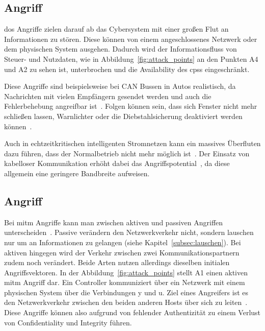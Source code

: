 \documentclass[final,bibliography=totocnumbered]{include/sikseminar}
\newcommand{\cps}{\glspl{cps}\xspace}
\begin{document}
\subsection{ Angriff}\label{subsec:dos}

\gls{dos} Angriffe zielen darauf ab das Cybersystem mit einer großen Flut an Informationen zu stören.
Diese können von einem angeschlossenes Netzwerk oder dem physischen System ausgehen.
Dadurch wird der Informationsfluss von Steuer- und Nutzdaten, wie in Abbildung~\ref{fig:attack_points} an den Punkten A4 und A2 zu sehen ist, unterbrochen und die Availability des \cps eingeschränkt.

Diese Angriffe sind beispielsweise bei CAN Bussen in Autos realistisch, da Nachrichten mit vielen Empfängern gesendet werden und auch die Fehlerbehebung angreifbar ist~\cite{Koscher2010,Cheminod2013}.%
Folgen können sein, dass sich Fenster nicht mehr schließen lassen, Warnlichter oder die Diebstahlsicherung deaktiviert werden können~\cite{Hoppe2008}.

Auch in echtzeitkritischen intelligenten Stromnetzen kann ein massives Überfluten dazu führen, dass der Normalbetrieb nicht mehr möglich ist~\cite{Lu2010}.
Der Einsatz von kabelloser Kommunikation erhöht dabei das Angriffspotential~\cite{Lu2011}, da diese allgemein eine geringere Bandbreite aufweisen.
\subsection{ Angriff}\label{subsec:mitm}
Bei \gls{mitm} Angriffe kann man zwischen aktiven und passiven Angriffen unterscheiden~\cite{WYX+10}.
Passive verändern den Netzwerkverkehr nicht, sondern lauschen nur um an Informationen zu gelangen (siehe Kapitel~\ref{subsec:lauschen}).
Bei aktiven hingegen wird der Verkehr zwischen zwei Kommunikationspartnern zudem noch verändert.
Beide Arten nutzen allerdings dieselben initialen Angriffsvektoren.
In der Abbildung~\ref{fig:attack_points} stellt A1 einen aktiven \gls{mitm} Angriff dar.
Ein Controller kommuniziert über ein Netzwerk mit einem physischen System über die Verbindungen y und u.
Ziel eines Angreifers ist es den Netzwerkverkehr zwischen den beiden anderen Hosts über sich zu leiten~\cite{WYX+10,FPA+18}.
Diese Angriffe können also aufgrund von fehlender Authentizität zu einem Verlust von Confidentiality und Integrity führen.
\end{document}
